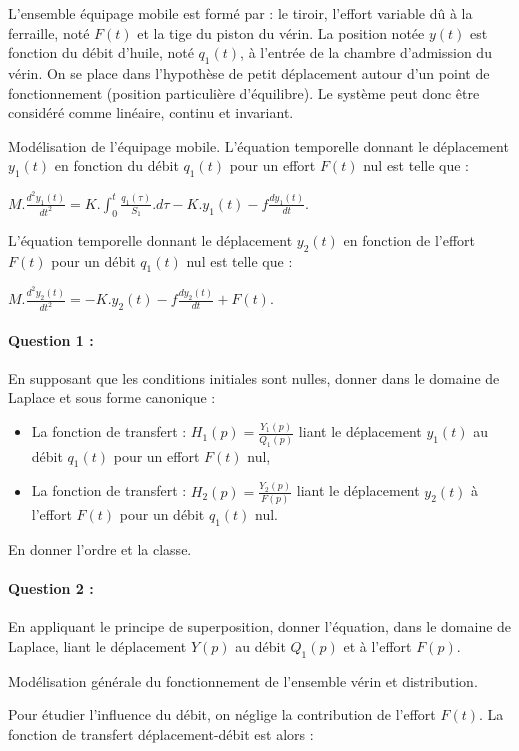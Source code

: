 L'ensemble \og équipage mobile \fg est formé par : le tiroir, l'effort variable dû à la ferraille, noté $F(t)$ et la tige du piston du vérin. La position notée $y(t)$ est fonction du débit d'huile, noté $q_1(t)$, à l'entrée de la chambre d'admission du vérin. On se place dans l'hypothèse de petit déplacement autour d'un point de fonctionnement (position particulière d'équilibre). Le système peut donc être considéré comme linéaire, continu et invariant.

Modélisation de l'équipage mobile. L'équation temporelle donnant le déplacement $y_1(t)$ en fonction du débit $q_1(t)$ pour un effort $F(t)$ nul est telle que :

$M.\frac{d^2y_1(t)}{dt^2}=K.\int_0^t \frac{q_1(\tau)}{S_1}.d\tau-K.y_1(t)-f\frac{d y_1(t)}{dt}$.

L'équation temporelle donnant le déplacement $y_2(t)$ en fonction de l'effort $F(t)$ pour un débit $q_1(t)$ nul est telle que :

$M.\frac{d^2y_2(t)}{dt^2}=-K.y_2(t)-f\frac{d y_2(t)}{dt}+F(t)$.

\paragraph{Question 1 :} En supposant que les conditions initiales sont nulles, donner dans le domaine de Laplace et sous forme canonique : 

\begin{itemize}
 \item La fonction de transfert : $H_1(p)=\frac{Y_1(p)}{Q_1(p)}$ liant le déplacement $y_1(t)$ au débit $q_1(t)$ pour un effort $F(t)$ nul, 
 \item La fonction de transfert : $H_2(p)=\frac{Y_2(p)}{F(p)}$ liant le déplacement $y_2(t)$ à l'effort $F(t)$ pour un débit $q_1(t)$ nul.
\end{itemize}
 
En donner l'ordre et la classe.

\paragraph{Question 2 :} En appliquant le principe de superposition, donner l'équation, dans le domaine de Laplace, liant le déplacement $Y(p)$ au débit $Q_1(p)$ et à l'effort $F(p)$.

Modélisation générale du fonctionnement de l'ensemble vérin et distribution. 

Pour étudier l'influence du débit, on néglige la contribution de l'effort $F(t)$. La fonction de transfert déplacement-débit est alors :

